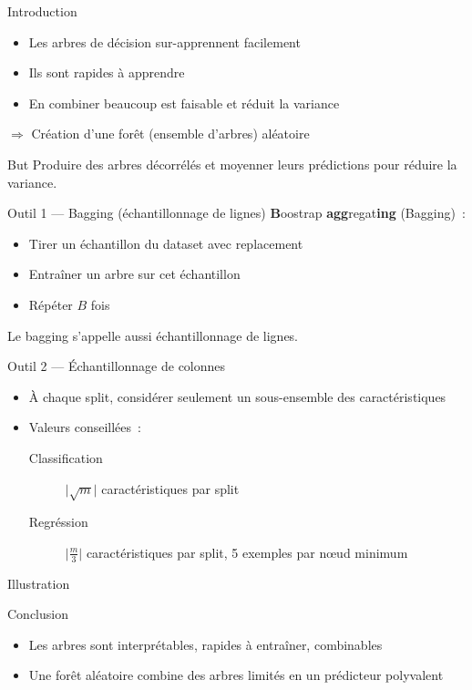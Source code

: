 \begin{frame}{Introduction}
  \begin{itemize}
    \item Les arbres de décision sur-apprennent facilement
    \item Ils sont rapides à apprendre
    \item En combiner beaucoup est faisable et réduit la variance
  \end{itemize}
  $\Rightarrow$ Création d'une forêt (ensemble d'arbres) aléatoire
\end{frame}

\begin{frame}{But}
  Produire des arbres décorrélés et moyenner leurs prédictions pour
  réduire la variance.
\end{frame}

\begin{frame}{Outil 1 — Bagging (échantillonnage de lignes)}
  \textbf{B}oostrap \textbf{agg}regat\textbf{ing} (Bagging) :
  \begin{itemize}
    \item Tirer un échantillon du dataset avec replacement
    \item Entraîner un arbre sur cet échantillon
    \item Répéter $B$ fois
  \end{itemize}
  Le bagging s'appelle aussi échantillonnage de lignes.
\end{frame}

\begin{frame}{Outil 2 — Échantillonnage de colonnes}
  \begin{itemize}
    \item À chaque split, considérer seulement un sous-ensemble des caractéristiques
    \item Valeurs conseillées~:
      \begin{description}
        \item[Classification] $\lvert\sqrt m\rvert$ caractéristiques par split
        \item[Regréssion] $\lvert\frac{m}{3}\rvert$ caractéristiques par split, 5 exemples par nœud minimum
      \end{description}
  \end{itemize}
\end{frame}

\begin{frame}{Illustration}
\end{frame}

\begin{frame}{Conclusion}
  \begin{itemize}
    \item Les arbres sont interprétables, rapides à entraîner, combinables
    \item Une forêt aléatoire combine des arbres limités en un prédicteur polyvalent
  \end{itemize}
\end{frame}
